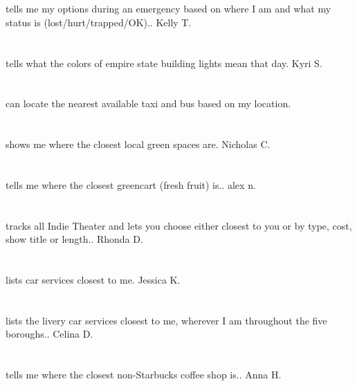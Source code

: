 \section{} tells me my options during an emergency based on where I am and what my status is (lost/hurt/trapped/OK).. Kelly T.
\section{}tells what the colors of empire state building lights mean that day. Kyri S.
\section{}can locate the nearest available taxi and bus based on my location. 
\section{}shows me where the closest local green spaces are. Nicholas C.
\section{}tells me where the closest greencart (fresh fruit) is.. alex n.
\section{}tracks all Indie Theater and lets you choose either closest to you or by type,  cost,  show title or length.. Rhonda D.
\section{} lists car services closest to me. Jessica K.
\section{} lists the livery car services closest to me,  wherever I am throughout the five boroughs.. Celina D.
\section{} tells me where the closest non-Starbucks coffee shop is.. Anna H.
